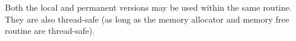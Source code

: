 \documentclass{article}
\begin{document}
Both the local and permanent versions may be used within the same routine.
They are also thread-safe (as long as the memory allocator 
and memory free routine  are thread-safe).




\end{document}
